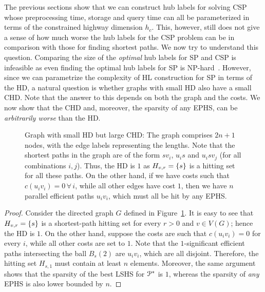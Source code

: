 The previous sections show that we can construct hub labels for solving CSP whose preprocessing time, storage and query time can all be parameterized in terms of the constrained highway dimension $h_c$. 
This, however, still does not give a sense of how much worse the hub labels for the CSP problem can be in comparison with those for finding shortest paths. 
We now try to understand this question.
Comparing the size of the \emph{optimal} hub labels for SP and CSP is infeasible as even finding the optimal hub labels for SP is NP-hard~\cite{babenko_hl_complexity}. 
However, since we can parametrize the complexity of HL construction for SP in terms of the HD, a natural question is whether graphs with small HD also have a small CHD. 
Note that the answer to this depends on both the graph and the costs.
We now show that the CHD and, moreover, the sparsity of any EPHS, can be \emph{arbitrarily worse} than the HD. 
\begin{figure}

\caption{Graph with small HD but large CHD: The graph comprises $2n+1$ nodes, with the edge labels representing the lengths. Note that the shortest paths in the graph are of the form $sv_i$, $u_is$ and $u_isv_j$ (for all combinations $i,j$). Thus, the HD is $1$ as $H_{v,r}=\{s\}$ is a hitting set for all these paths. On the other hand, if we have costs such that $c(u_iv_i)=0\,\forall\,i$, while all other edges have cost $1$, then we have $n$ parallel efficient paths $u_iv_i$, which must all be hit by any EPHS.}
\label{fig:big_chd}
\end{figure}
\begin{proof}
Consider the directed graph $G$ defined in Figure~\ref{fig:big_chd}.
It is easy to see that $H_{v,r}=\{s\}$ is a shortest-path hitting set for every $r>0$ and $v\in V(G)$; hence the HD is $1$.
On the other hand, suppose the costs are such that $c(u_iv_i)=0$ for every $i$, while all other costs are set to $1$.
Note that the $1$-significant efficient paths intersecting the ball $B_s(2)$ are $u_iv_i$, which are all disjoint.
Therefore, the hitting set $H_{s,1}$ must contain at least $n$ elements. Moreover, the same argument shows that the sparsity of the best LSHS for $\mathcal{P}^*$ is $1$, whereas the sparsity of \emph{any} EPHS is also lower bounded by $n$.  
\end{proof}

